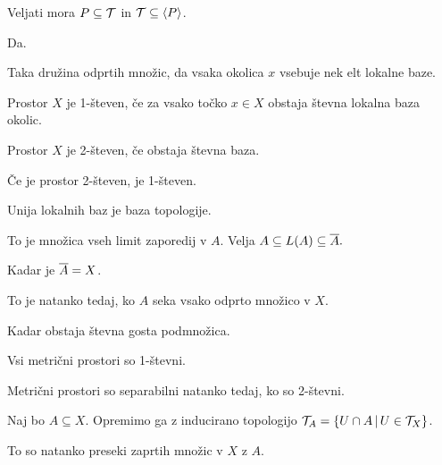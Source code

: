 Veljati mora $P \subseteq \mathcal{T}$ in $\mathcal{T} \subseteq \left<P\right>$.


Da.


Taka družina odprtih množic, da vsaka okolica $x$ vsebuje nek elt lokalne baze.


Prostor $X$ je 1-števen, če za vsako točko $x \in X$ obstaja
števna lokalna baza okolic.

Prostor $X$ je 2-števen, če obstaja števna baza.

Če je prostor 2-števen, je 1-števen.


Unija lokalnih baz je baza topologije.


To je množica vseh limit zaporedij v $A$.
Velja $A \subseteq L(A) \subseteq \overline{A}.$


Kadar je $\overline{A} = X$.

To je natanko tedaj, ko $A$ seka vsako odprto množico v $X$.


Kadar obstaja števna gosta podmnožica.


Vsi metrični prostori so 1-števni.

Metrični prostori so separabilni natanko tedaj, ko so 2-števni.


Naj bo $A \subseteq X$. Opremimo ga z inducirano topologijo
$\mathcal{T}_A = \{ U \cap A \,|\, U \in \mathcal{T}_X \}$.


To so natanko preseki zaprtih množic v $X$ z $A$.


